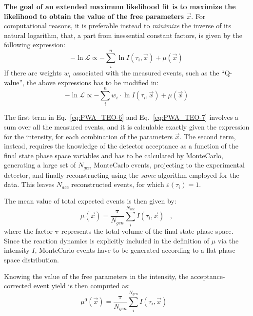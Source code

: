 \documentclass[a4paper,10pt]{report}
\begin{document}
\textbf{The goal of an extended maximum likelihood fit is to maximize the likelihood to obtain the value of the free parameters $\vec{x}$}. For computational reasons, it is preferable instead to \textit{minimize} the inverse of its natural logarithm, that,
 a part from inessential constant factors, is given by the following expression:
\begin{equation}\label{eq:PWA_TEO-6}
-\ln{\mathcal L}\propto -\sum_i^n \ln{I(\tau_i,\vec{x})} + \mu(\vec{x})
\end{equation}
If there are weights $w_i$ associated with the measured events, such as the ``Q-value'', the above expressions has to be modified in:
\begin{equation}\label{eq:PWA_TEO-7}
-\ln{\mathcal L}\propto -\sum_i^n w_i\cdot\ln{I(\tau_i,\vec{x})} + \mu(\vec{x})
\end{equation}

The first term in Eq.~\ref{eq:PWA_TEO-6} and Eq.~\ref{eq:PWA_TEO-7} involves a sum over all the measured events, and it is calculable exactly given the expression for the intensity, for each combination of the parameters $\vec{x}$.
 The second term, instead, requires the knowledge of the detector acceptance as a function of the final state phase space variables
and has to be calculated by MonteCarlo, generating a large set of $N_{gen}$ MonteCarlo events, projecting to the experimental detector, and finally reconstructing using the \textit{same} algorithm employed for the data.
 This leaves $N_{acc}$ reconstructed events, for which $\varepsilon(\tau_i)=1$. 

The mean value of total expected events is then given by:
\begin{equation}\label{eq:PWA_TEO-8}
\mu(\vec{x})=\frac{\boldsymbol{\tau}}{N_{gen}}\sum_i^{N_{acc}} I(\tau_i,\vec{x}) \; \; \; ,
\end{equation}
where the factor $\boldsymbol{\tau}$ represents the total volume of the final state phase space.
Since the reaction dynamics is explicitly included in the definition of $\mu$ via the intensity $I$, MonteCarlo events have to be generated according to a flat phase space distribution.

Knowing the value of the free parameters in the intensity, the acceptance-corrected event yield is then computed as:
\begin{equation}
\mu^0(\vec{x}) = \frac{\boldsymbol{\tau}}{N_{gen}}\sum_i^{N_{gen}} I(\tau_i,\vec{x}) \; \; \; 
\end{equation}
\end{document}
